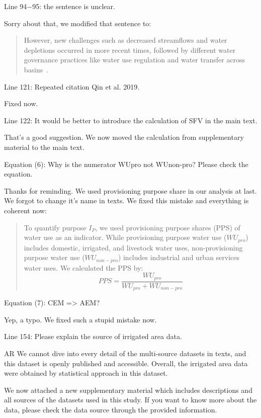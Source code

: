 \RC{} Line 94$-$95: the sentence is unclear.

\AR{} Sorry about that, we modified that sentence to:

\begin{quote}
	However, new challenges such as decreased streamflows and water depletions occurred in more recent times, followed by different water governance practices like water use regulation and water transfer across basins~\cite{wang2019c}.
\end{quote}

\RC{} Line 121: Repeated citation Qin et al. 2019.

\AR{} Fixed now.

\RC{} Line 122: It would be better to introduce the calculation of SFV in the main text.

\AR{} That's a good suggestion. We now moved the calculation from supplementary material to the main text.

\RC{} Equation (6): Why is the numerator WUpro not WUnon-pro? Please check the equation.

\AR{} Thanks for reminding. We used provisioning purpose share in our analysis at last. We forgot to change it's name in texts. We fixed this mistake and everything is coherent now:

\begin{quote}
	To quantify purpose $I_P$, we used provisioning purpose shares (PPS) of water use as an indicator. While provisioning purpose water use ($WU_{pro}$) includes domestic, irrigated, and livestock water uses, non-provisioning purpose water use ($WU_{non-pro}$) includes industrial and urban services water uses. We calculated the PPS by:
	\begin{equation}
		PPS = \frac{WU_{pro}}{WU_{pro} + WU_{non-pro}}
	\end{equation}
\end{quote}

\RC{} Equation (7): CEM => AEM?\

\AR{} Yep, a typo. We fixed such a stupid mistake now.

\RC{} Line 154: Please explain the source of irrigated area data.

AR{} We cannot dive into every detail of the multi-source datasets in texts, and this dataset is openly published and accessible. Overall, the irrigated area data were obtained by statistical approach in this dataset.

\AR*{} We now attached a new supplementary material which includes descriptions and all sources of the datasets used in this study. If you want to know more about the data, please check the data source through the provided information.

